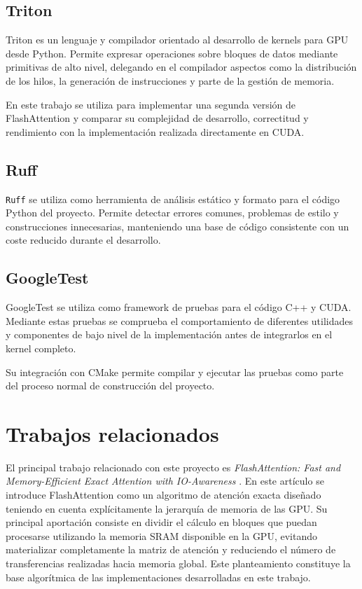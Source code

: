 \subsection{Triton}

Triton es un lenguaje y compilador orientado al desarrollo de kernels para GPU desde Python. Permite expresar operaciones sobre bloques de datos mediante primitivas de alto nivel, delegando en el compilador aspectos como la distribución de los hilos, la generación de instrucciones y parte de la gestión de memoria.

En este trabajo se utiliza para implementar una segunda versión de FlashAttention y comparar su complejidad de desarrollo, correctitud y rendimiento con la implementación realizada directamente en CUDA.

\subsection{Ruff}

\texttt{Ruff} se utiliza como herramienta de análisis estático y formato para el código Python del proyecto. Permite detectar errores comunes, problemas de estilo y construcciones innecesarias, manteniendo una base de código consistente con un coste reducido durante el desarrollo.

\subsection{GoogleTest}

GoogleTest se utiliza como framework de pruebas para el código C++ y CUDA. Mediante estas pruebas se comprueba el comportamiento de diferentes utilidades y componentes de bajo nivel de la implementación antes de integrarlos en el kernel completo.

Su integración con CMake permite compilar y ejecutar las pruebas como parte del proceso normal de construcción del proyecto.


\section{Trabajos relacionados}

El principal trabajo relacionado con este proyecto es \textit{FlashAttention: Fast and Memory-Efficient Exact Attention with IO-Awareness} \cite{dao2022flashattention}. En este artículo se introduce FlashAttention como un algoritmo de atención exacta diseñado teniendo en cuenta explícitamente la jerarquía de memoria de las GPU. Su principal aportación consiste en dividir el cálculo en bloques que puedan procesarse utilizando la memoria SRAM disponible en la GPU, evitando materializar completamente la matriz de atención y reduciendo el número de transferencias realizadas hacia memoria global. Este planteamiento constituye la base algorítmica de las implementaciones desarrolladas en este trabajo.

